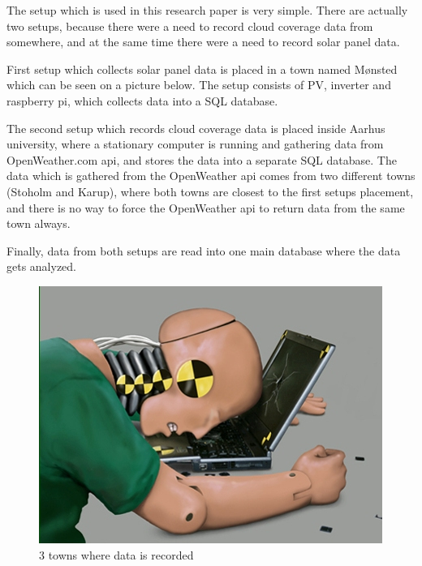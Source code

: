 The setup which is used in this research paper is very simple. There are
actually two setups, because there were a need to record cloud
coverage data from somewhere, and at the same time there were a need
to record solar panel data.

First setup which collects solar panel data is placed in a town named
Mønsted which can be seen on a picture below. The setup consists of
PV, inverter and raspberry pi, which collects data into a SQL
database.

The second setup which records cloud coverage data is placed inside
Aarhus university, where a stationary computer is running and
gathering data from OpenWeather.com api, and stores the data into
a separate SQL database. The data which is gathered from the OpenWeather api
comes from two different towns (Stoholm and Karup), where both towns are
closest to the first setups placement, and there is no way to force the
OpenWeather api to return data from the same town always.

Finally, data from both setups are read into one main database where the data
gets analyzed.

\begin{figure}[h]
  \centering
 \includegraphics{dummy.jpg}
  \caption{3 towns where data is recorded}
      \label{fig:MapsPicture}
\end{figure}
